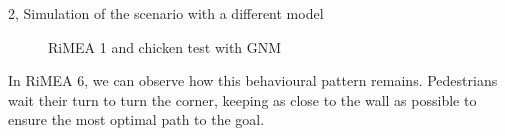 \begin{task}{2, Simulation of the scenario with a different model}
\begin{figure}[H] 
\centering
{}
\caption{RiMEA 1 and chicken test with GNM}
\label{rimeachickengnm}
\end{figure}

In RiMEA 6, we can observe how this behavioural pattern remains. Pedestrians wait their turn to turn the corner, keeping as close to the wall as possible to ensure the most optimal path to the goal.


\end{task}
